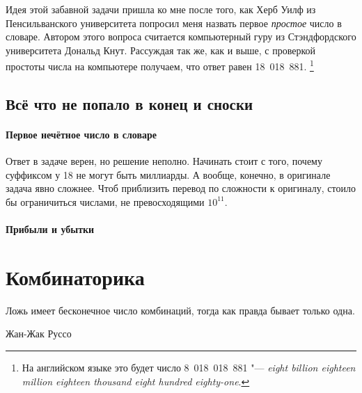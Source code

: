 \documentclass[twoside]{book}
\begin{document}
Идея этой забавной задачи пришла ко мне после того, как Херб Уилф из Пенсильванского университета %
попросил меня назвать первое \emph{простое} число в словаре.
Автором этого вопроса считается компьютерный гуру из Стэндфордского университета Дональд Кнут. %
Рассуждая так же, как и выше, с проверкой простоты числа на компьютере
получаем, что ответ равен 18~018~881.%
\footnote{На английском языке это будет число 8~018~018~881 "--- \emph{eight billion eighteen million eighteen thou\-sand eight hundred eighty-one}.
}

\section*{Всё что не попало в конец и сноски}


 

\subsubsection{Первое нечётное число в словаре}
Ответ в задаче верен, но решение неполно.
Начинать стоит с того, почему суффиксом у 18 не могут быть миллиарды. 
А вообще, конечно, в оригинале задача явно сложнее.
Чтоб приблизить перевод по сложности к оригиналу, стоило бы ограничиться числами, не превосходящими $10^{11}$.


\subsubsection{Прибыли и убытки}



\chapter{Комбинаторика}

\setlength{\epigraphwidth}{.5\textwidth}
\epigraph{Ложь имеет бесконечное число комбинаций,
тогда как правда бывает только одна.\vspace{1ex}}{Жан-Жак Руссо}
\end{document}
